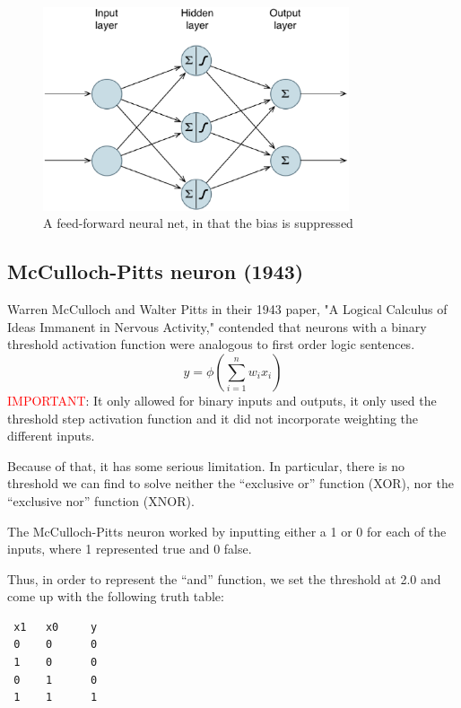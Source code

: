 \begin{figure}[hbt]
  \centerline{\includegraphics[height=6cm,
    angle=0]{./images/perceptron_neuralnet.eps}}
\caption{A feed-forward neural net, in that the bias is suppressed}
\label{fig:perceptron_neuralnet}
\end{figure}

\subsection{McCulloch-Pitts neuron (1943)}

 Warren McCulloch and Walter Pitts  in their 1943 paper, "A Logical Calculus of
 Ideas Immanent in Nervous Activity," contended that neurons with a binary
 threshold activation function were analogous to first order logic sentences.
 \begin{equation}
y = \phi \left( \sum_{i=1}^n w_i x_i \right)
 \end{equation}
\textcolor{red}{IMPORTANT}:  It only allowed for binary inputs and outputs, it
only used the threshold step activation function and it did not incorporate
weighting the different inputs.

\begin{mdframed}

Because of that, it has some serious limitation. In particular, there is no
threshold we can find to solve neither the “exclusive or” function (XOR), nor
the “exclusive nor” function (XNOR).

\end{mdframed}

 The McCulloch-Pitts neuron worked by inputting either a 1 or 0 for each of the
 inputs, where 1 represented true and 0 false.
 
 Thus, in order to represent the “and” function, we set the threshold at 2.0 and
 come up with the following truth table:
 \begin{verbatim}
 x1   x0     y
 0    0      0
 1    0      0
 0    1      0
 1    1      1
 \end{verbatim}

